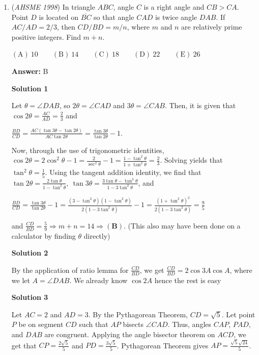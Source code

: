 \begin{enumerate}
	\item (\textit{AHSME 1998}) In triangle $ABC$, angle $C$ is a right angle and $CB > CA$. Point $D$ is located on $\overline{BC}$ so that angle $CAD$ is twice angle $DAB$. If $AC/AD = 2/3$, then $CD/BD = m/n$, where $m$ and $n$ are relatively prime positive integers. Find $m+n$.


 $\mathrm{(A) \ }10 \qquad \mathrm{(B) \ }14 \qquad \mathrm{(C) \ }18 \qquad \mathrm{(D) \ }22 \qquad \mathrm{(E) \ } 26$

 \textbf{Answer: }B



\textbf{Solution 1}

Let $\theta = \angle DAB$, so $2\theta = \angle CAD$ and $3 \theta = \angle CAB$. Then, it is given that $\cos 2\theta = \frac{AC}{AD} = \frac{2}{3}$ and

 


 $\frac{BD}{CD} = \frac{AC(\tan 3\theta - \tan 2\theta)}{AC \tan 2\theta} = \frac{\tan 3\theta}{\tan 2\theta} - 1.$

 
Now, through the use of trigonometric identities, $\cos 2\theta = 2\cos^2 \theta - 1 = \frac{2}{\sec ^2 \theta} - 1 = \frac{1 - \tan^2 \theta}{1 + \tan ^2 \theta} = \frac{2}{3}$. Solving yields that $\tan^2 \theta = \frac 15$. Using the tangent addition identity, we find that $\tan 2\theta = \frac{2\tan \theta}{1 - \tan ^2 \theta},\ \tan 3\theta = \frac{3\tan \theta - \tan^3 \theta}{1 - 3\tan^2 \theta}$, and

 


 $\frac{BD}{CD} = \frac{\tan 3\theta}{\tan 2\theta} - 1 = \frac{(3 - \tan^2 \theta)(1-\tan ^2 \theta)}{2(1 - 3\tan^2 \theta)} - 1 = \frac{(1 + \tan^2 \theta)^2}{2(1 - 3\tan^2 \theta)} = \frac{9}{5}$

 
and $\frac{CD}{BD} = \frac{5}{9} \Longrightarrow m+n = 14 \Longrightarrow \mathbf{(B)}$. (This also may have been done on a calculator by finding $\theta$ directly)

 



\textbf{Solution 2}

By the application of ratio lemma for $\frac{CD}{BD}$, we get $\frac{CD}{BD} = 2\cos{3A}\cos{A}$, where we let $A = \angle{DAB}$. We already know $\cos{2A}$ hence the rest is easy

 



\textbf{Solution 3}

Let $AC=2$ and $AD=3$. By the Pythagorean Theorem, $CD=\sqrt{5}$. Let point $P$ be on segment $CD$ such that $AP$ bisects $\angle CAD$. Thus, angles $CAP$, $PAD$, and $DAB$ are congruent. Applying the angle bisector theorem on $ACD$, we get that $CP=\frac{2\sqrt{5}}{5}$ and $PD=\frac{3\sqrt{5}}{5}$. Pythagorean Theorem gives $AP=\frac{\sqrt{5}\sqrt{24}}{5}$.


\end{enumerate}
